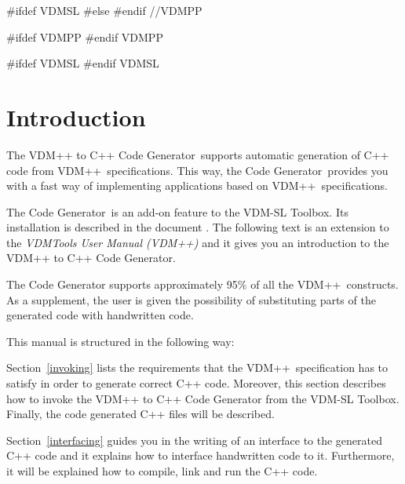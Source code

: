 \documentclass[\pformat,12pt]{article}
\newcommand{\ToolboxName}{VDM-SL Toolbox}
\newcommand{\toolbox}{Toolbox}
\newcommand{\ToolboxName}{VDM++ Toolbox}
\newcommand{\toolbox}{toolbox}
\begin{document}
#ifdef VDMSL
#else
#endif //VDMPP


\newcommand{\tcg}{the Code Generator}
\newcommand{\Tcg}{The Code Generator}

#ifdef VDMPP
\newcommand{\libmancite}{\cite{LibMan-SCSK}}
\newcommand{\langmancite}{\cite{LangManPP-SCSK}}
\newcommand{\VDM}{VDM++}
\newcommand{\cg}{VDM++ to C++ Code Generator}
\newcommand{\MCL}{VDM C++ Library}
\newcommand{\CGBase}{\texttt{CGBase}}
#endif VDMPP

#ifdef VDMSL
\newcommand{\libmancite}{\cite{LibMan-SCSK}}
\newcommand{\langmancite}{\cite{LangMan-SCSK}}
\newcommand{\cg}{VDM-SL to C++ Code Generator}
\newcommand{\MCL}{VDM C++ Library}
\newcommand{\VDM}{VDM-SL}
#endif VDMSL


\section{Introduction}


The \cg\ supports automatic generation of C++ code from \VDM\ 
specifications. This way, \tcg\ provides you with a fast way of
implementing applications based on \VDM\ specifications.

 \Tcg\ is an add-on
feature to the \ToolboxName{}. Its installation is described in the document
.
The following text is an extension to the {\em VDMTools User Manual (\VDM{})}
\ifthenelse{\boolean{VDMsl}}{\cite{UserMan-SCSK}}{\cite{UserManPP-SCSK}} and it
gives you an introduction to 
the \cg{}.

The Code Generator supports approximately 95\% of all the \VDM\ constructs.
As a supplement, the user is given the possibility of substituting parts of
the generated code with handwritten code. 

This manual is structured in the following way:

Section~\ref{invoking} lists the requirements that the \VDM\ specification
has to satisfy in order to generate correct C++ code.
Moreover, this section describes how to invoke the \cg{} from the
 \ToolboxName{}. Finally, the code generated C++ files will be described.

Section~\ref{interfacing} guides you in the writing of 
an interface to the generated C++ code and it explains how to interface
handwritten code to it. Furthermore, it will be explained how
to compile, link and run the C++ code.  
\end{document}
